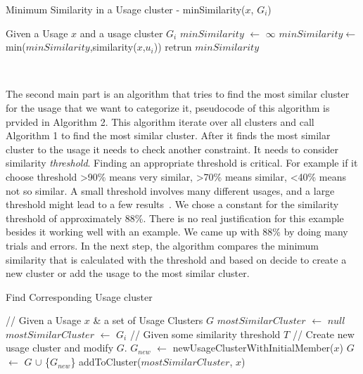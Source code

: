 \documentclass[conference]{IEEEtran}
\begin{document}
\begin{algorithm}
\label{algo1}
    \caption{Minimum Similarity in a Usage cluster - minSimilarity($x$, $G_{i}$)} 
    \begin{algorithmic}[1]
    \State Given a Usage $x$ and a usage cluster $G_{i}$
    \State $minSimilarity$ $\leftarrow$ $\infty$
    \State $minSimilarity$$\leftarrow$min($minSimilarity$,similarity($x$,$u_{i}$)) \EndFor
   \State retrun $minSimilarity$
    \end{algorithmic} 
     \
\end{algorithm}

The second main part is an algorithm that tries to find the most similar cluster for the usage that we want to categorize it, pseudocode of this algorithm is prvided in Algorithm 2. This algorithm iterate over all clusters and call Algorithm 1 to find the most similar cluster. After it finds the most similar cluster to the usage it needs to check another constraint. It needs to consider similarity \textit{threshold}. Finding an appropriate threshold is critical. For example if it choose threshold \textgreater 90\% means very similar, \textgreater 70\% means similar, \textless 40\% means not so similar. A small threshold involves many different usages, and a large threshold might lead to a few results~\cite{deng2013top}. We chose a constant for the similarity threshold of approximately 88\%. There is no real justification for this example besides it working well with an example. We came up with 88\% by doing many trials and errors. In the next step, the algorithm compares the minimum similarity that is calculated with the threshold and based on decide to create a new cluster or add the usage to the most similar cluster. 

\begin{algorithm}
\label{algo2}
    \caption{Find Corresponding Usage cluster} 
    \begin{algorithmic}[1]
    \State // Given a Usage $x$ \& a set of Usage Clusters $G$
    \State $mostSimilarCluster$ $\leftarrow$ $null$
    \State $mostSimilarCluster$ $\leftarrow$ $G_{i}$
    \EndIf
    \EndFor
    \State // Given some similarity threshold $T$
        \State // Create new usage cluster and modify $G$.
        \State $G_{new}$ $\leftarrow$ newUsageClusterWithInitialMember($x$)
        \State $G$ $\leftarrow$ $G$ $\cup$ \{$G_{new}$\}
    \Else
    \State addToCluster($mostSimilarCluster$, $x$)
    \EndIf
    \end{algorithmic} 
\end{algorithm}
\end{document}
